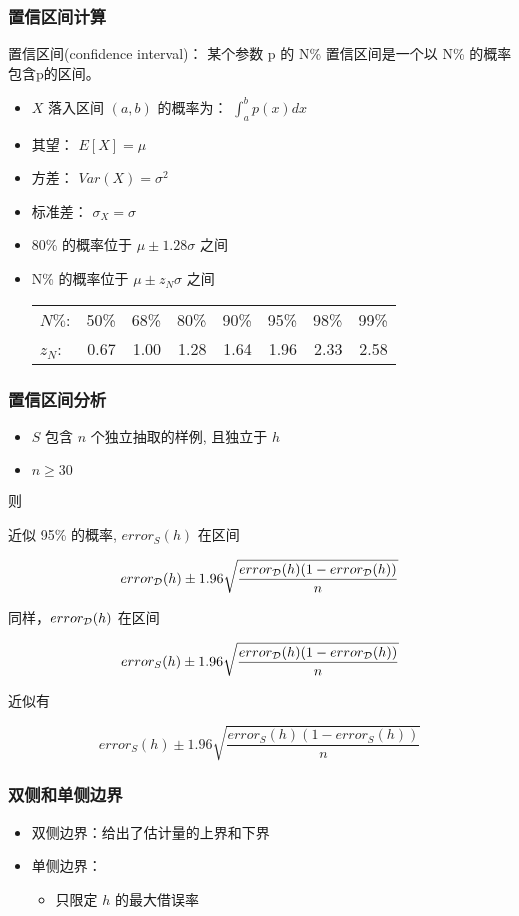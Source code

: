 \documentclass{beamer}
\begin{document}
\begin{frame}
\frametitle{置信区间计算}
\label{sec-3-4}

置信区间(confidence interval)： 某个参数 p 的 N\% 置信区间是一个以 N\% 的概率包含p的区间。

\begin{itemize}
\item $X$ 落入区间 $(a,b)$ 的概率为：  $\int_{a}^{b} p(x) dx$
\item 其望： $E[X] = \mu$
\item 方差： $Var(X) = \sigma^{2}$
\item 标准差： $\sigma_{X} = \sigma$
\item 80\% 的概率位于 $\mu \pm 1.28 \sigma$ 之间
\item N\% 的概率位于 $\mu \pm z_{N} \sigma$ 之间

\begin{center}
\begin{tabular}{lrrrrrrr}
 $N\%$:    &  50\%  &  68\%  &  80\%  &  90\%  &  95\%  &  98\%  &  99\%  \\
 $z_{N}$:  &  0.67  &  1.00  &  1.28  &  1.64  &  1.96  &  2.33  &  2.58  \\
\end{tabular}
\end{center}


\end{itemize}
\end{frame}
\begin{frame}
\frametitle{置信区间分析}
\label{sec-3-5}

\begin{itemize}
\item $S$ 包含 $n$ 个独立抽取的样例, 且独立于 $h$
\item $n \geq 30$
\end{itemize}

则

近似 95\% 的概率, $error_{S}(h)$ 在区间

$$error_{\cal{D}}(h) \pm 1.96 \sqrt{\frac{error_{\cal{D}}(h) (1 - error_{\cal{D}}(h))}{n}}$$

同样，$error_{\cal{D}}(h)$ 在区间

\[ error_{S}(h) \pm 1.96 \sqrt{\frac{error_{\cal{D}}(h) (1 - error_{\cal{D}}(h))}{n}} \]

近似有

\[ error_{S}(h) \pm 1.96 \sqrt{\frac{error_{S}(h) (1 - error_{S}(h))}{n}} \]
\end{frame}
\begin{frame}
\frametitle{双侧和单侧边界}
\label{sec-3-6}

\begin{itemize}
\item 双侧边界：给出了估计量的上界和下界
\item 单侧边界：
\begin{itemize}
\item 只限定 $h$  的最大借误率
\end{itemize}
\end{itemize}
\end{frame}
\end{document}
